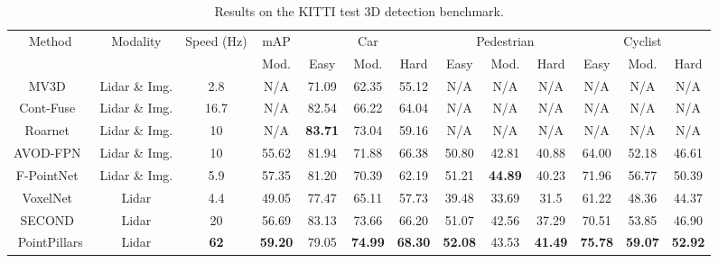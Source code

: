 \documentclass[10pt,twocolumn,letterpaper]{article}
\begin{document}
\begin{table*}[]
\small
\begin{tabular}{| c | c | c || c || c | c | c || c | c | c || c | c | c |}
\hline
\multirow{2}{*}{Method}				& \multirow{2}{*}{Modality}			& \multirow{2}{10mm}{Speed (Hz)}	& mAP		& \multicolumn{3}{|c||}{Car}		& \multicolumn{3}{|c||}{Pedestrian}		& \multicolumn{3}{|c|}{Cyclist}	\\ \cline{4-13}
					&				& 		& Mod.		& Easy		& Mod.		& Hard		& Easy		& Mod.		& Hard		& Easy		& Mod.		& Hard	\\ \hline 
MV3D~\cite{mv3d}		& Lidar \& Img.	& 2.8		& N/A		& 71.09		& 62.35 		& 55.12		&  N/A		&  N/A 			&  N/A		&  N/A 		&  N/A 		&  N/A	\\ 
Cont-Fuse~\cite{contfuse}		& Lidar \& Img.	& 16.7			& N/A		& 82.54		&  66.22		& 64.04		&  N/A		&  N/A 			&  N/A		&  N/A 		&  N/A 		&  N/A	\\ 
Roarnet~\cite{roarnet}	& Lidar \& Img.	& 10			& N/A		& \textbf{83.71}		&  73.04		& 59.16		&  N/A		&  N/A 			&  N/A		&  N/A 		&  N/A 		&  N/A	\\ 
AVOD-FPN~\cite{avod}	& Lidar \& Img.	& 10		& 55.62		& 81.94 	 	& 71.88	 	& 66.38		& 50.80		& 42.81			& 40.88	& 64.00	 	& 52.18		& 46.61	\\ 
F-PointNet~\cite{frustum}	&  Lidar \& Img.	& 5.9		& 57.35		& 81.20		& 70.39 	 	& 62.19		& 51.21		& \textbf{44.89}		& 40.23		& 71.96	& 56.77 & 50.39	\\ \hline
VoxelNet~\cite{voxelnet}	& Lidar			& 4.4		& 49.05		& 77.47		& 65.11  		& 57.73		& 39.48		& 33.69			& 31.5		& 61.22		& 48.36		& 44.37	\\
SECOND~\cite{second}	& Lidar			& 20			& 56.69		& 83.13 	& 73.66	 	& 66.20		& 51.07		& 42.56			& 37.29		& 70.51		& 53.85 		& 46.90 	\\ \hline
PointPillars			& Lidar			& \textbf{62} 	& \textbf{59.20}	& 79.05		& \textbf{74.99}	& \textbf{68.30}	& \textbf{52.08}	& 43.53			& \textbf{41.49}		& \textbf{75.78} 		& \textbf{59.07}		& \textbf{52.92}	\\ \hline
\end{tabular}
\caption{Results on the KITTI test 3D detection benchmark.}
\label{table:res_3d}
\end{table*}
\end{document}
